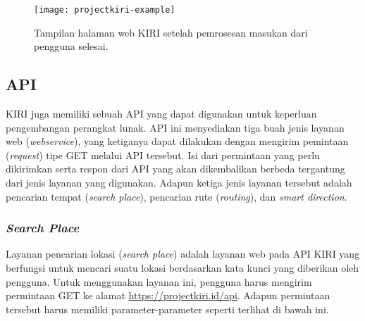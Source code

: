 \begin{figure}[ht]
    \centering
    \texttt{[image: projectkiri-example]}
    \caption[Tampilan akhir halaman web KIRI]{Tampilan halaman web KIRI setelah pemrosesan masukan dari pengguna selesai.}
    \label{fig:kiri-example}
\end{figure}

\newpage
\subsection{API\protect\footnotemark}
\label{sec:kiri-api}

KIRI juga memiliki sebuah API yang dapat digunakan untuk keperluan pengembangan perangkat lunak. API ini menyediakan tiga buah jenis layanan web (\textit{webservice}), yang ketiganya dapat dilakukan dengan mengirim pemintaan (\textit{request}) tipe GET melalui API tersebut. Isi dari permintaan yang perlu dikirimkan serta respon dari API yang akan dikembalikan berbeda tergantung dari jenis layanan yang digunakan. Adapun ketiga jenis layanan tersebut adalah pencarian tempat (\textit{search place}), pencarian rute (\textit{routing}), dan \textit{smart direction}.
 
\subsubsection{\textit{Search Place}}
\label{sec:kiri-api-searchplace}

Layanan pencarian lokasi (\textit{search place}) adalah layanan web pada API KIRI yang berfungsi untuk mencari suatu lokasi berdasarkan kata kunci yang diberikan oleh pengguna. Untuk menggunakan layanan ini, pengguna harus mengirim permintaan GET ke alamat \href{https://projectkiri.id/api}{https://projectkiri.id/api}. Adapun permintaan tersebut harus memiliki parameter-parameter seperti terlihat di bawah ini.

